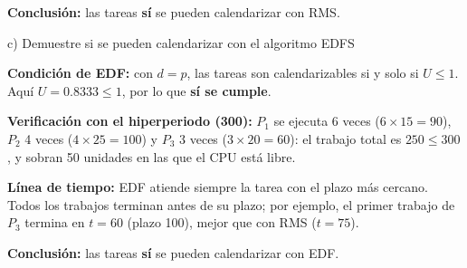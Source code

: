 \documentclass[a4paper, 11pt]{article}
\newcommand{\Aspace}{0.2cm}
\begin{document}
\begin{enumerate}
{        \textbf{Conclusión:} las tareas \textbf{sí} se pueden calendarizar con RMS.

        }

        \newpage
        \vspace{\Aspace} \par
        c) Demuestre si se pueden calendarizar con el algoritmo EDFS
        \par { \color{azul} 
        \textbf{Condición de EDF:} con $d=p$, las tareas son calendarizables si y solo si $U \le 1$. Aquí $U = 0.8333 \le 1$, por lo que \textbf{sí se cumple}.

        \textbf{Verificación con el hiperperiodo (300):} $P_1$ se ejecuta 6 veces ($6 \times 15 = 90$), $P_2$ 4 veces ($4 \times 25 = 100$) y $P_3$ 3 veces ($3 \times 20 = 60$): el trabajo total es $250 \le 300$, y sobran 50 unidades en las que el CPU está libre.

        \textbf{Línea de tiempo:} EDF atiende siempre la tarea con el plazo más cercano. Todos los trabajos terminan antes de su plazo; por ejemplo, el primer trabajo de $P_3$ termina en $t=60$ (plazo 100), mejor que con RMS ($t=75$).

        \textbf{Conclusión:} las tareas \textbf{sí} se pueden calendarizar con EDF.
        }


\end{enumerate}
\end{document}
